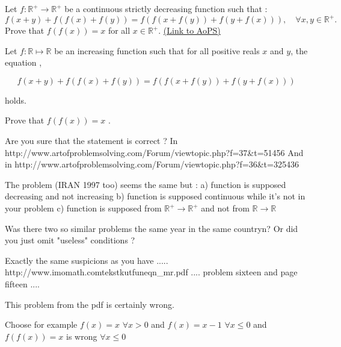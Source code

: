 \begin{problem}
	Let $f: \mathbb R^+\to \mathbb R^+$ be a continuous strictly decreasing function such that :
\[f(x+y) + f(f(x)+f(y)) = f(f(x+f(y)) + f(y+f(x))), \quad \forall x,y\in\mathbb R^+.\]
Prove that $f(f(x))=x$ for all $x\in\mathbb R^+$.
	\flushright \href{https://artofproblemsolving.com/community/c6h416312}{(Link to AoPS)}
\end{problem}



\begin{solution}
	\begin{tcolorbox}Let $ f : \mathbb{R} \longmapsto \mathbb{R} $ be an increasing function such that for all positive reals $ x $ and $ y $, the equation , 

\[ f( x+ y) + f ( f(x) + f(y) ) = f ( f(x+ f(y)) + f(   y + f(x)) ) \] 

holds. 

Prove that  $  f( f( x)) = x$  .\end{tcolorbox}
Are you sure that the statement is correct ?
In http://www.artofproblemsolving.com/Forum/viewtopic.php?f=37&t=51456
And in http://www.artofproblemsolving.com/Forum/viewtopic.php?f=36&t=325436

The problem (IRAN 1997 too) seems the same but :
a) function is supposed decreasing and not increasing
b) function is supposed continuous while it's not in your problem
c) function is supposed from $\mathbb R^+\to\mathbb R^+$ and not from $\mathbb R\to\mathbb R$

Was there two so similar problems the same year in the same countryn?
Or did you just omit "useless" conditions ?
\end{solution}



\begin{solution}
	Exactly the same suspicions as you have ..... 
http://www.imomath.com\/tekstkut\/funeqn_mr.pdf .... 
problem sixteen and page fifteen ....
\end{solution}



\begin{solution}
	This problem from the pdf is certainly wrong.

Choose for example $f(x)=x$ $\forall x>0$ and $f(x)=x-1$ $\forall x\le 0$ and $f(f(x))=x$ is wrong $\forall x\le 0$
\end{solution}



